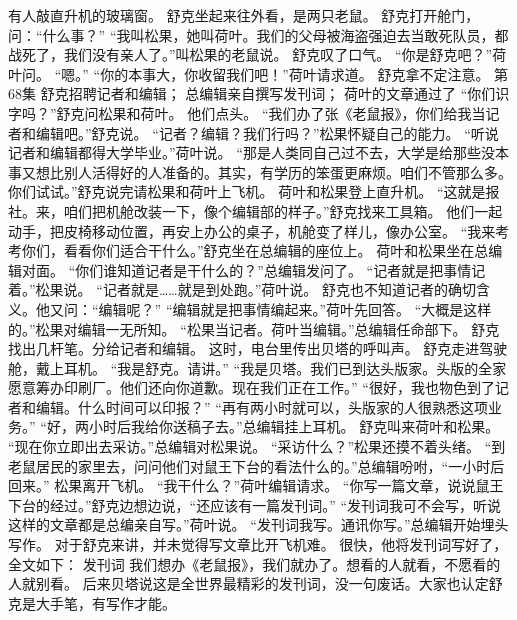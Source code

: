 \documentclass[a4paper,12pt,UTF8,twoside]{ctexbook}
\begin{document}
        有人敲直升机的玻璃窗。 
        舒克坐起来往外看，是两只老鼠。 
        舒克打开舱门，问：“什么事？” 
        “我叫松果，她叫荷叶。我们的父母被海盗强迫去当敢死队员，都战死了，我们没有亲人了。”叫松果的老鼠说。 
        舒克叹了口气。 
        “你是舒克吧？”荷叶问。 
        “嗯。” 
        “你的本事大，你收留我们吧！”荷叶请求道。 
        舒克拿不定注意。   第68集 
        舒克招聘记者和编辑； 
        总编辑亲自撰写发刊词； 
        荷叶的文章通过了   
        “你们识字吗？”舒克问松果和荷叶。 
        他们点头。 
        “我们办了张《老鼠报》，你们给我当记者和编辑吧。”舒克说。 
        “记者？编辑？我们行吗？”松果怀疑自己的能力。 
        “听说记者和编辑都得大学毕业。”荷叶说。 
        “那是人类同自己过不去，大学是给那些没本事又想比别人活得好的人准备的。其实，有学历的笨蛋更麻烦。咱们不管那么多。你们试试。”舒克说完请松果和荷叶上飞机。 
        荷叶和松果登上直升机。 
        “这就是报社。来，咱们把机舱改装一下，像个编辑部的样子。”舒克找来工具箱。 
        他们一起动手，把皮椅移动位置，再安上办公的桌子，机舱变了样儿，像办公室。 
        “我来考考你们，看看你们适合干什么。”舒克坐在总编辑的座位上。 
        荷叶和松果坐在总编辑对面。 
        “你们谁知道记者是干什么的？”总编辑发问了。 
        “记者就是把事情记着。”松果说。 
        “记者就是……就是到处跑。”荷叶说。 
        舒克也不知道记者的确切含义。他又问：“编辑呢？” 
        “编辑就是把事情编起来。”荷叶先回答。 
        “大概是这样的。”松果对编辑一无所知。 
        “松果当记者。荷叶当编辑。”总编辑任命部下。 
        舒克找出几杆笔。分给记者和编辑。 
        这时，电台里传出贝塔的呼叫声。 
        舒克走进驾驶舱，戴上耳机。 
        “我是舒克。请讲。” 
        “我是贝塔。我们已到达头版家。头版的全家愿意筹办印刷厂。他们还向你道歉。现在我们正在工作。” 
        “很好，我也物色到了记者和编辑。什么时间可以印报？” 
        “再有两小时就可以，头版家的人很熟悉这项业务。” 
        “好，两小时后我给你送稿子去。”总编辑挂上耳机。 
        舒克叫来荷叶和松果。 
        “现在你立即出去采访。”总编辑对松果说。 
        “采访什么？”松果还摸不着头绪。 
        “到老鼠居民的家里去，问问他们对鼠王下台的看法什么的。”总编辑吩咐，“一小时后回来。” 
        松果离开飞机。 
        “我干什么？”荷叶编辑请求。 
        “你写一篇文章，说说鼠王下台的经过。”舒克边想边说，“还应该有一篇发刊词。” 
        “发刊词我可不会写，听说这样的文章都是总编亲自写。”荷叶说。 
        “发刊词我写。通讯你写。”总编辑开始埋头写作。 
        对于舒克来讲，并未觉得写文章比开飞机难。 
        很快，他将发刊词写好了，全文如下： 
        发刊词 
        我们想办《老鼠报》，我们就办了。想看的人就看，不愿看的人就别看。 
        后来贝塔说这是全世界最精彩的发刊词，没一句废话。大家也认定舒克是大手笔，有写作才能。 
\end{document}
